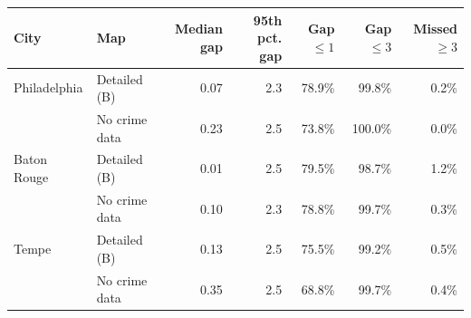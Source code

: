 \begin{tabular}{llrrrrr}
\toprule
City & Map & Median gap & 95th pct. gap & Gap $\le 1$ & Gap $\le 3$ & Missed $\ge 3$ \\
\midrule
Philadelphia & Detailed (B) & 0.07 & 2.3 & 78.9\% & 99.8\% & 0.2\% \\
 & No crime data & 0.23 & 2.5 & 73.8\% & 100.0\% & 0.0\% \\
Baton Rouge & Detailed (B) & 0.01 & 2.5 & 79.5\% & 98.7\% & 1.2\% \\
 & No crime data & 0.10 & 2.3 & 78.8\% & 99.7\% & 0.3\% \\
Tempe & Detailed (B) & 0.13 & 2.5 & 75.5\% & 99.2\% & 0.5\% \\
 & No crime data & 0.35 & 2.5 & 68.8\% & 99.7\% & 0.4\% \\
\bottomrule
\end{tabular}
